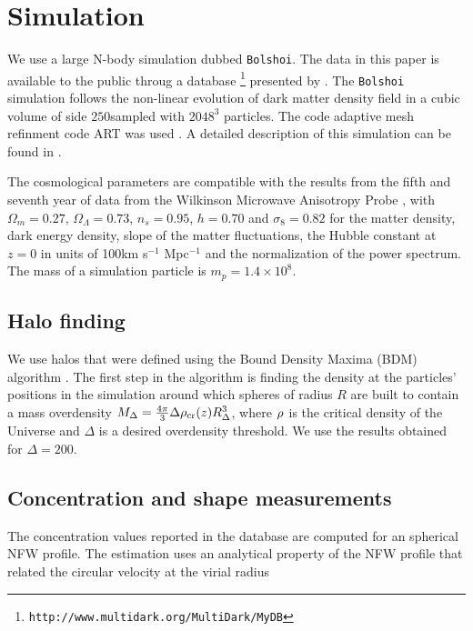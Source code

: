 

   
\section{Simulation}\label{Simulations}

We use a large N-body simulation dubbed \verb"Bolshoi". The data in
this paper is available to the public throug a
database \footnote{\texttt{http://www.multidark.org/MultiDark/MyDB}}
presented by \cite{Riebe:2011gp}. The \verb"Bolshoi" simulation follows 
the non-linear evolution of dark matter density field in a cubic
volume of side $250$\hMpc sampled with $2048^3$ particles. The code
adaptive mesh refinment code ART was used  \citep{Klypin09}. A detailed
description of this simulation can be found in \cite{Klypin:2010qw}.

The cosmological parameters are compatible with the results from the
fifth and seventh year of data from the Wilkinson Microwave Anisotropy
Probe \citep{Komatsu2009,Jarosik2011}, with $\Omega_m=0.27$,
$\Omega_{\Lambda}=0.73$, $n_{s}=0.95$, $h=0.70$ and $\sigma_8=0.82$
for the matter density, dark energy density, slope of the matter
fluctuations, the Hubble constant at $z=0$ in units of 100km s$^{-1}$
Mpc$^{-1}$ and the normalization of the power spectrum. The mass of a
simulation particle is $m_p = 1.4\times 10^{8}$\hMsun. 


\subsection{Halo finding}

We use halos that were defined using the Bound Density Maxima (BDM)
algorithm \citep{KlypinBDM}. The first step in the algorithm is
finding the density at the particles' positions in the simulation
around which spheres of radius $R$ are built to contain a mass
overdensity $M_{\Delta} = \frac{4\pi}{3}\Delta \rho_{\rm
  cr}(z)R_{\Delta}^{3}$, where $\rho_{\rm}$ is the critical density of
the Universe and $\Delta$ is a desired overdensity threshold. We use
the results obtained for $\Delta=200$.


\subsection{Concentration and shape measurements}

The concentration values reported in the database are computed for an
spherical NFW profile.  The estimation uses an analytical property of
the NFW profile that related the circular velocity at the virial radius

